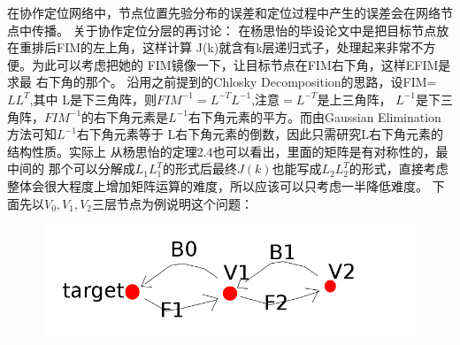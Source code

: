 \documentclass[12pt]{article}
\begin{document}
\title{\textbf{}} 

\author{}
\maketitle
\large
在协作定位网络中，节点位置先验分布的误差和定位过程中产生的误差会在网络节点中传播。
关于协作定位分层的再讨论：
在杨思怡的毕设论文中是把目标节点放在重排后FIM的左上角，这样计算
J(k)就含有k层递归式子，处理起来非常不方便。为此可以考虑把她的
FIM镜像一下，让目标节点在FIM右下角，这样EFIM是求最
右下角的那个。
沿用之前提到的Chlosky Decomposition的思路，设FIM=$LL^T$,其中
L是下三角阵，则$FIM^{-1}=L^{-T}L^{-1}$,注意$=L^{-T}$是上三角阵，
$L^{-1}$是下三角阵，$FIM^{-1}$的右下角元素是$L^{-1}$右下角元素的平方。而由Gaussian Elimination方法可知$L^{-1}$右下角元素等于
L右下角元素的倒数，因此只需研究L右下角元素的结构性质。实际上
从杨思怡的定理2.4也可以看出，里面的矩阵是有对称性的，最中间的
那个可以分解成$L_1L_1^T$的形式后最终$J(k)$也能写成$L_2L_2^T$的形式，直接考虑整体会很大程度上增加矩阵运算的难度，所以应该可以只考虑一半降低难度。
下面先以$V_0,V_1,V_2$三层节点为例说明这个问题：
\begin{figure}[!ht]
\includegraphics[width=\linewidth]{001.png}
\end{figure}
\end{document}
